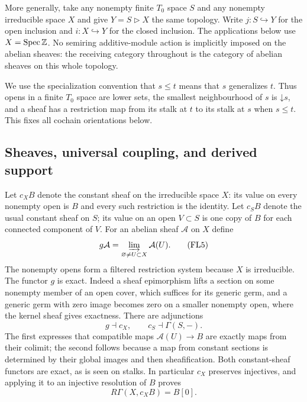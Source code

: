 More generally, take any nonempty finite $T_0$ space $S$ and any
nonempty irreducible space $X$ and give $Y=S\triangleright X$ the
same topology. Write $j:S\hookrightarrow Y$ for the open inclusion
and $i:X\hookrightarrow Y$ for the closed inclusion. The applications
below use $X=\operatorname{Spec}\mathbb Z$. No semiring additive-module action is
implicitly imposed on the abelian sheaves: the receiving category
throughout is the category of abelian sheaves on this whole topology.

We use the specialization convention that $s\le t$ means that $s$
generalizes $t$. Thus opens in a finite $T_0$ space are lower sets,
the smallest neighbourhood of $s$ is $\mathord\downarrow s$, and a
sheaf has a restriction map from its stalk at $t$ to its stalk at $s$
when $s\le t$. This fixes all cochain orientations below.

\subsection{Sheaves, universal coupling, and derived support}

Let $c_X B$ denote the constant sheaf on the irreducible space $X$:
its value on every nonempty open is $B$ and every such restriction is
the identity. Let $c_S B$ denote the usual constant sheaf on $S$;
its value on an open $V\subset S$ is one copy of $B$ for each connected
component of $V$. For an abelian sheaf $\mathcal A$ on $X$ define
\[
 g\mathcal A=\varinjlim_{\varnothing\ne U\subset X}\mathcal A(U).
 \tag{FL5}\label{FL:eq:generic}
\]
The nonempty opens form a filtered restriction system because $X$ is
irreducible. The functor $g$ is exact. Indeed a sheaf epimorphism lifts
a section on some nonempty member of an open cover, which suffices for
its generic germ, and a generic germ with zero image becomes zero on
a smaller nonempty open, where the kernel sheaf gives exactness.
There are adjunctions
\[
 g\dashv c_X,\qquad c_S\dashv\Gamma(S,-).
 \tag{FL6}\label{FL:eq:constant-adjunctions}
\]
The first expresses that compatible maps $\mathcal A(U)\to B$ are
exactly maps from their colimit; the second follows because a map from
constant sections is determined by their global images and then
sheafification. Both constant-sheaf functors are exact, as is seen on
stalks. In particular $c_X$ preserves injectives, and applying it to
an injective resolution of $B$ proves
\[
 R\Gamma(X,c_XB)=B[0].
 \tag{FL7}\label{FL:eq:constant-acyclic}
\]


